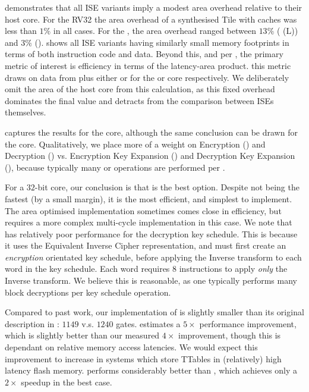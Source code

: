 
demonstrates that all ISE variants
imply a modest area overhead relative to their host core.
For the RV32  the area overhead of a synthesised  Tile with
caches was less than $1\%$ in all cases.
For the , the area overhead ranged between
$13\%$ ( (L))
and
$3\%$ ().
shows all ISE variants
having similarly small memory footprints in terms of both instruction code and
data.
Beyond this, and per 
,
the primary metric of interest is efficiency in terms of
the latency-area product.
this metric draws on data from
plus either
or
for the  or  core respectively.
We deliberately omit the area of the host core from this calculation, as this
fixed overhead dominates the final value and detracts from the comparison
between ISEs themselves.

captures the results for the  core, although the same conclusion can 
be drawn for the  core.  Qualitatively, we place more of a weight on 
Encryption ()
and 
Decryption ()
vs.
Encryption Key Expansion ()
and 
Decryption Key Expansion (),
because
typically many  or  operations are performed per
.

For a $32$-bit core, our conclusion is that
is the best option.
Despite not being the fastest (by a small margin), it is the most efficient,
and simplest to implement.
The area optimised  implementation sometimes comes close in
efficiency, but requires a more complex multi-cycle implementation
in this case.
We note that  has relatively poor performance for the decryption
key schedule.
This is because it uses the Equivalent Inverse Cipher representation,
and must first create an {\em encryption} orientated key schedule, before
applying the Inverse  transform to each word in the key schedule.
Each word requires $8$ instructions to apply {\em only} the Inverse  
transform. We believe this is reasonable, as one typically performs
many block decryptions per key schedule operation.

Compared to past work, our implementation of  is
slightly smaller than its original description in \cite{Saarinen:20}:
$1149$ v.s. $1240$ gates.
\cite{Saarinen:20} estimates a $5\times$ performance improvement, which is
slightly better than our measured $4\times$ improvement, though this is
dependant on relative memory access latencies.
We would expect this improvement to increase in systems which store TTables
in (relatively) high latency flash memory.
 performs considerably better than \cite{TilGroSze:05},
which achieves only a $2\times$ speedup in the best case.


